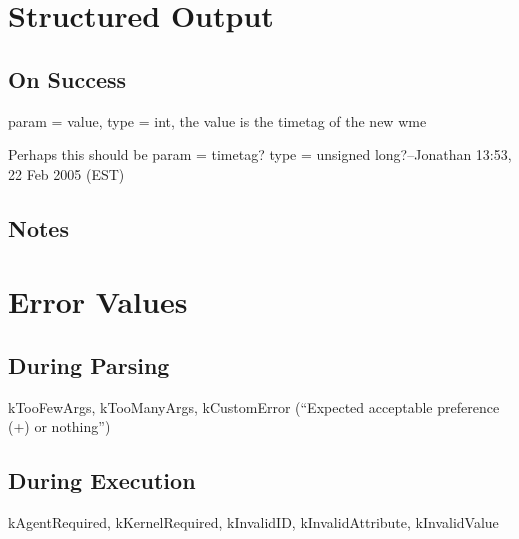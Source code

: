 \documentclass[10pt]{article}
\begin{document}
\section*{ Structured Output }
\subsection*{ On Success }


 param = value, type = int, the value is the timetag of the new wme 


 Perhaps this should be param = timetag? type = unsigned long?--Jonathan 13:53, 22 Feb 2005 (EST) 
\subsection*{ Notes }
\section*{ Error Values }
\subsection*{ During Parsing }


 kTooFewArgs, kTooManyArgs, kCustomError (``Expected acceptable preference (+) or nothing'') 
\subsection*{ During Execution }


 kAgentRequired, kKernelRequired, kInvalidID, kInvalidAttribute, kInvalidValue
\end{document}
